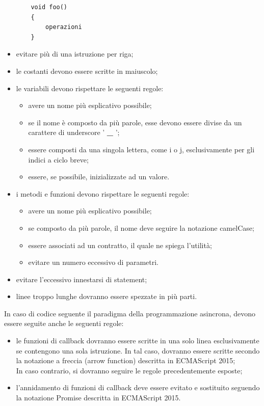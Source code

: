 \begin{itemize}
\begin{lstlisting}
 	void foo()
 	{
     	operazioni
 	}
 	\end{lstlisting}
 	\item evitare più di una istruzione per riga;
 	\item le costanti devono essere scritte in maiuscolo;
 	\item le variabili devono rispettare le seguenti regole:
 	\begin{itemize}
 		\item avere un nome più esplicativo possibile;
 		\item se il nome è composto da più parole, esse devono essere divise da un carattere di underscore ' \textbf{\_} ';
 		\item essere composti da una singola lettera, come i o j, esclusivamente per gli indici a ciclo breve;
 		\item essere, se possibile, inizializzate ad un valore.
 	\end{itemize}
 	\item i metodi e funzioni devono rispettare le seguenti regole:
 	\begin{itemize}
 		\item avere un nome più esplicativo possibile;
 		\item se composto da più parole, il nome deve seguire la notazione camelCase;
 		\item essere associati ad un contratto, il quale ne spiega l'utilità;
 		\item evitare un numero eccessivo di parametri.
 	\end{itemize}
 	\item evitare l'eccessivo innestarsi di statement;
 	\item linee troppo lunghe dovranno essere spezzate in più parti.
 \end{itemize}
In caso di codice seguente il paradigma della programmazione asincrona, devono essere seguite anche le seguenti regole:
\begin{itemize}
	\item le funzioni di callback dovranno essere scritte in una solo linea esclusivamente se contengono una sola istruzione. In tal caso, dovranno essere scritte secondo la notazione a freccia (arrow function) descritta in ECMAScript 2015;\\
	 In caso contrario, si dovranno seguire le regole precedentemente esposte;
	 \item l'annidamento di funzioni di callback deve essere evitato e sostituito seguendo la notazione Promise descritta in ECMAScript 2015.
\end{itemize}

